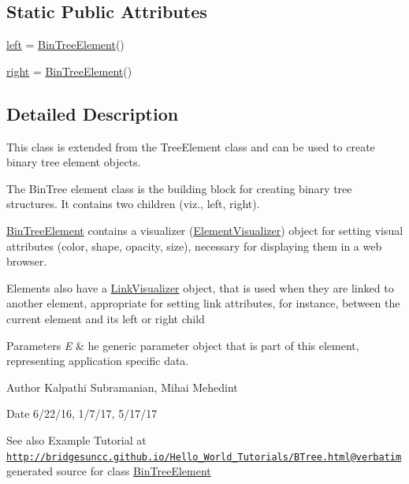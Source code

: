 \subsection*{Static Public Attributes}
\begin{DoxyCompactItemize}
\item 
\hyperlink{class_bin_tree_element_1_1_bin_tree_element_a73a75929ad5c317a59915283866ddb7a}{left} = \hyperlink{class_bin_tree_element_1_1_bin_tree_element}{Bin\+Tree\+Element}()
\item 
\hyperlink{class_bin_tree_element_1_1_bin_tree_element_a9e5201df4cc9cc2a970b35ba036bca5a}{right} = \hyperlink{class_bin_tree_element_1_1_bin_tree_element}{Bin\+Tree\+Element}()
\end{DoxyCompactItemize}


\subsection{Detailed Description}
This class is extended from the Tree\+Element class and can be used to create binary tree element objects. 

The Bin\+Tree element class is the building block for creating binary tree structures. It contains two children (viz., left, right).

\hyperlink{class_bin_tree_element_1_1_bin_tree_element}{Bin\+Tree\+Element} contains a visualizer (\hyperlink{namespace_element_visualizer}{Element\+Visualizer}) object for setting visual attributes (color, shape, opacity, size), necessary for displaying them in a web browser.

Elements also have a \hyperlink{namespace_link_visualizer}{Link\+Visualizer} object, that is used when they are linked to another element, appropriate for setting link attributes, for instance, between the current element and its left or right child


\begin{DoxyParams}{Parameters}
{\em E} & he generic parameter object that is part of this element, representing application specific data.\\
\hline
\end{DoxyParams}
\begin{DoxyAuthor}{Author}
Kalpathi Subramanian, Mihai Mehedint
\end{DoxyAuthor}
\begin{DoxyDate}{Date}
6/22/16, 1/7/17, 5/17/17
\end{DoxyDate}
\begin{DoxySeeAlso}{See also}
Example Tutorial at ~\newline
 \href{http://bridgesuncc.github.io/Hello_World_Tutorials/BTree.html@verbatim}{\tt http\+://bridgesuncc.\+github.\+io/\+Hello\+\_\+\+World\+\_\+\+Tutorials/\+B\+Tree.\+html@verbatim} generated source for class \hyperlink{class_bin_tree_element_1_1_bin_tree_element}{Bin\+Tree\+Element}  
\end{DoxySeeAlso}


